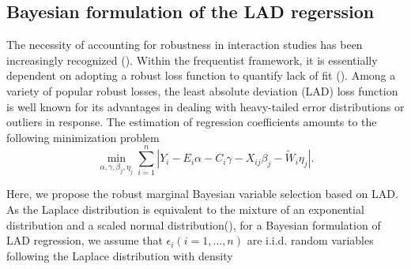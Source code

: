 \documentclass[12pt]{article}
\begin{document}
\subsection{Bayesian formulation of the LAD regerssion}

The necessity of accounting for robustness in interaction studies has been increasingly recognized (\cite{ZFR}). Within the frequentist framework, it is essentially dependent on adopting a robust loss function to quantify lack of fit (\cite{WUM}). Among a variety of popular robust losses, the least absolute deviation (LAD) loss function is well known for its advantages in dealing with heavy-tailed error distributions or outliers in response. The estimation of regression coefficients amounts to the following minimization problem
\begin{equation*}
\min_{\alpha, \gamma, \beta_{j}, \eta_{j}} \sum_{i=1}^{n}|Y_{i}-E_{i}\alpha - C_{i}\gamma - X_{ij}\beta_{j} - \tilde{W}_{i}\eta_{j}|.
\end{equation*}

Here, we propose the robust marginal Bayesian variable selection based on LAD.  As the Laplace distribution is equivalent to the mixture of an exponential distribution and a scaled normal distribution(\cite{KOZU}), for a Bayesian formulation of LAD regression, we assume that $\epsilon_{i} (i=1,\dots,n)$ are i.i.d. random variables following the Laplace distribution with density
\end{document}
